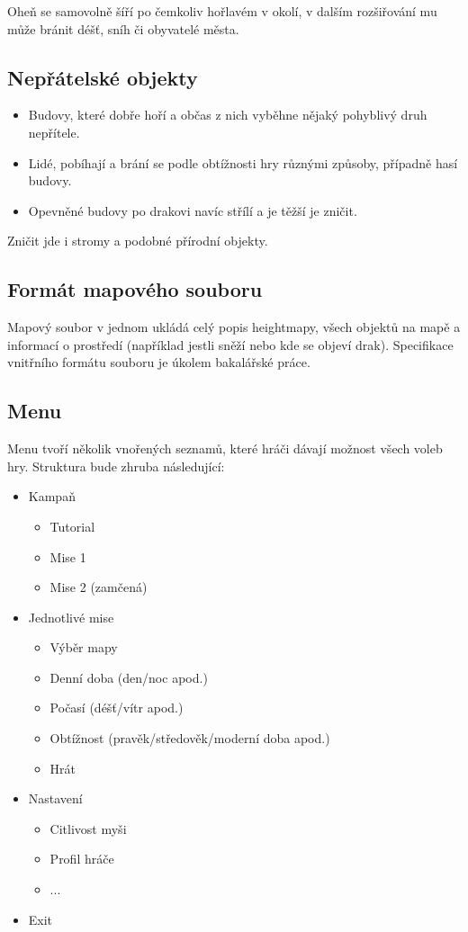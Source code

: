 \documentclass{article}
\begin{document}
Oheň se samovolně šíří po čemkoliv hořlavém v okolí, v dalším rozšiřování mu může bránit déšť, sníh či obyvatelé města.

\subsection{Nepřátelské objekty}

\begin{itemize}
\item Budovy, které dobře hoří a občas z nich vyběhne nějaký pohyblivý druh nepřítele.
\item Lidé, pobíhají a brání se podle obtížnosti hry různými způsoby, případně hasí budovy.
\item Opevněné budovy po drakovi navíc střílí a je těžší je zničit.
\end{itemize}

Zničit jde i stromy a podobné přírodní objekty.

\subsection{Formát mapového souboru}

Mapový soubor v jednom ukládá celý popis heightmapy, všech objektů na mapě a informací o prostředí (například jestli sněží nebo kde se objeví drak). Specifikace vnitřního formátu souboru je úkolem bakalářské práce.

\subsection{Menu}

Menu tvoří několik vnořených seznamů, které hráči dávají možnost všech voleb hry. Struktura bude zhruba následující:

\begin{itemize}
\item Kampaň 
	\begin{itemize}
	\item Tutorial
	\item Mise 1
	\item Mise 2 (zamčená)
	\end{itemize}
\item Jednotlivé mise
	\begin{itemize}
	\item Výběr mapy
	\item Denní doba (den/noc apod.)
	\item Počasí (déšť/vítr apod.)
	\item Obtížnost (pravěk/středověk/moderní doba apod.)
	\item Hrát
	\end{itemize}
\item Nastavení
	\begin{itemize}
	\item Citlivost myši
	\item Profil hráče
	\item ...
	\end{itemize}
\item Exit
\end{itemize}
\end{document}
